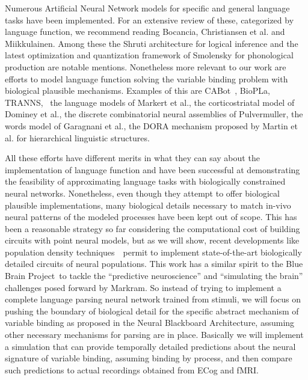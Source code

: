 \documentclass[10pt]{article}
\begin{document}
Numerous Artificial Neural Network models for specific and general
language tasks have been implemented. For an extensive review of these,
categorized by language function, we recommend reading
Bocancia\cite{bocancia2014psycholinguistically}, Christiansen et al.\cite{Christiansen_1999} and
Miikkulainen\cite{miikkulainen1997natural}. Among these the Shruti architecture for
logical inference\cite{Wendelken_2004} and the latest optimization and
quantization framework of Smolensky for phonological
production\cite{Smolensky_2013} are notable mentions. Nonetheless more
relevant to our work are efforts to model language function solving the
variable binding problem with biological plausible mechanisms. Examples
of this are CABot~\cite{Huyck_2009}, BioPLa\cite{Garcia_Rosa},
TRANNS\cite{bocancia2014psycholinguistically}, ~the language models of Markert et
al.\cite{Markert_2007}, the corticostriatal model of Dominey et
al.\cite{Dominey_2009}, the discrete combinatorial neural assemblies of
Pulvermuller\cite{Pulverm_ller_2009,Pulverm_ller_2010}, the words model of Garagnani et
al.\cite{Garagnani_2017}, the DORA mechanism proposed by Martin et al. for
hierarchical linguistic structures\cite{Martin_2017}.

All these efforts have different merits in what they can say about the
implementation of language function and have been successful at
demonstrating the feasibility of approximating language tasks with
biologically constrained neural networks. Nonetheless, even though they
attempt to offer biological plausible implementations, many biological
details necessary to match in-vivo neural patterns of the modeled
processes have been kept out of scope. This has been a reasonable
strategy so far considering the computational cost of building circuits
with point neural models, but as we will show, recent developments like
population density techniques~\cite{de2013generica}~permit to implement
state-of-the-art biologically detailed circuits of neural populations.
This work has a similar spirit to the Blue Brain
Project\cite{Markram_2006}~to tackle the ``predictive neuroscience'' and
``simulating the brain'' challenges posed forward by
Markram\cite{markram2013seven}. So instead of trying to implement a complete
language parsing neural network trained from stimuli, we will focus on
pushing the boundary of biological detail for the specific abstract
mechanism of variable binding as proposed in the Neural Blackboard
Architecture\cite{van_der_Velde_2006}, assuming other necessary mechanisms for
parsing are in place. Basically we will implement a simulation that can
provide temporally detailed predictions about the neural signature of
variable binding, assuming binding by process, and then compare such predictions to actual recordings obtained from ECog and fMRI.
\end{document}
